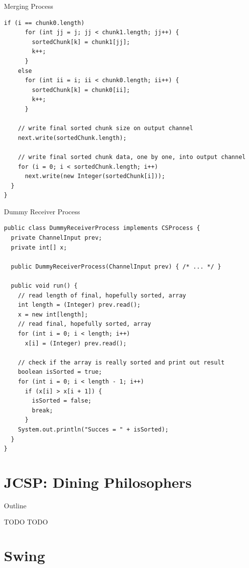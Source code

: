 \begin{frame}[fragile]{Merging Process}
\begin{lstlisting}[basicstyle=\fontsize{7}{9}\selectfont\ttfamily]
    if (i == chunk0.length)
      for (int jj = j; jj < chunk1.length; jj++) {
        sortedChunk[k] = chunk1[jj];
        k++;
      }
    else
      for (int ii = i; ii < chunk0.length; ii++) {
        sortedChunk[k] = chunk0[ii];
        k++;
      }

    // write final sorted chunk size on output channel
    next.write(sortedChunk.length);

    // write final sorted chunk data, one by one, into output channel
    for (i = 0; i < sortedChunk.length; i++)
      next.write(new Integer(sortedChunk[i]));
  }
}
\end{lstlisting}
\end{frame}

\begin{frame}[fragile]{Dummy Receiver Process}
\begin{lstlisting}[basicstyle=\fontsize{7}{9}\selectfont\ttfamily]
public class DummyReceiverProcess implements CSProcess {
  private ChannelInput prev;
  private int[] x;

  public DummyReceiverProcess(ChannelInput prev) { /* ... */ }

  public void run() {
    // read length of final, hopefully sorted, array
    int length = (Integer) prev.read();
    x = new int[length];
    // read final, hopefully sorted, array
    for (int i = 0; i < length; i++)
      x[i] = (Integer) prev.read();

    // check if the array is really sorted and print out result
    boolean isSorted = true;
    for (int i = 0; i < length - 1; i++)
      if (x[i] > x[i + 1]) {
        isSorted = false;
        break;
      }
    System.out.println("Succes = " + isSorted);
  }
}
\end{lstlisting}
\end{frame}


\section{JCSP: Dining Philosophers}

\begin{frame}{Outline}
  \tableofcontents[current]
\end{frame}

\begin{frame}{TODO}
  TODO
\end{frame}


\section{Swing}

